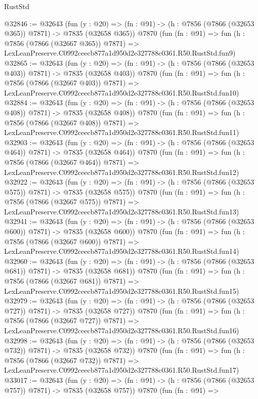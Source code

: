 \begin{lexlean}{RustStd}
\begin{coremodule}
@32846 := @32643
    (fun (y : @20) => (fn : @91) -> (h : @7856 (@7866 (@32653 @365)) @7871) -> @7835 (@32658 @365))
    @7870
    (fun (fn : @91) =>
    fun (h : @7856 (@7866 (@32667 @365)) @7871) =>
    LexLeanPreserve.C0992ceecb877a1d950d2e327788c0361.R50.RustStd.fun9)
@32865 := @32643
    (fun (y : @20) => (fn : @91) -> (h : @7856 (@7866 (@32653 @403)) @7871) -> @7835 (@32658 @403))
    @7870
    (fun (fn : @91) =>
    fun (h : @7856 (@7866 (@32667 @403)) @7871) =>
    LexLeanPreserve.C0992ceecb877a1d950d2e327788c0361.R50.RustStd.fun10)
@32884 := @32643
    (fun (y : @20) => (fn : @91) -> (h : @7856 (@7866 (@32653 @408)) @7871) -> @7835 (@32658 @408))
    @7870
    (fun (fn : @91) =>
    fun (h : @7856 (@7866 (@32667 @408)) @7871) =>
    LexLeanPreserve.C0992ceecb877a1d950d2e327788c0361.R50.RustStd.fun11)
@32903 := @32643
    (fun (y : @20) => (fn : @91) -> (h : @7856 (@7866 (@32653 @464)) @7871) -> @7835 (@32658 @464))
    @7870
    (fun (fn : @91) =>
    fun (h : @7856 (@7866 (@32667 @464)) @7871) =>
    LexLeanPreserve.C0992ceecb877a1d950d2e327788c0361.R50.RustStd.fun12)
@32922 := @32643
    (fun (y : @20) => (fn : @91) -> (h : @7856 (@7866 (@32653 @575)) @7871) -> @7835 (@32658 @575))
    @7870
    (fun (fn : @91) =>
    fun (h : @7856 (@7866 (@32667 @575)) @7871) =>
    LexLeanPreserve.C0992ceecb877a1d950d2e327788c0361.R50.RustStd.fun13)
@32941 := @32643
    (fun (y : @20) => (fn : @91) -> (h : @7856 (@7866 (@32653 @600)) @7871) -> @7835 (@32658 @600))
    @7870
    (fun (fn : @91) =>
    fun (h : @7856 (@7866 (@32667 @600)) @7871) =>
    LexLeanPreserve.C0992ceecb877a1d950d2e327788c0361.R50.RustStd.fun14)
@32960 := @32643
    (fun (y : @20) => (fn : @91) -> (h : @7856 (@7866 (@32653 @681)) @7871) -> @7835 (@32658 @681))
    @7870
    (fun (fn : @91) =>
    fun (h : @7856 (@7866 (@32667 @681)) @7871) =>
    LexLeanPreserve.C0992ceecb877a1d950d2e327788c0361.R50.RustStd.fun15)
@32979 := @32643
    (fun (y : @20) => (fn : @91) -> (h : @7856 (@7866 (@32653 @727)) @7871) -> @7835 (@32658 @727))
    @7870
    (fun (fn : @91) =>
    fun (h : @7856 (@7866 (@32667 @727)) @7871) =>
    LexLeanPreserve.C0992ceecb877a1d950d2e327788c0361.R50.RustStd.fun16)
@32998 := @32643
    (fun (y : @20) => (fn : @91) -> (h : @7856 (@7866 (@32653 @732)) @7871) -> @7835 (@32658 @732))
    @7870
    (fun (fn : @91) =>
    fun (h : @7856 (@7866 (@32667 @732)) @7871) =>
    LexLeanPreserve.C0992ceecb877a1d950d2e327788c0361.R50.RustStd.fun17)
@33017 := @32643
    (fun (y : @20) => (fn : @91) -> (h : @7856 (@7866 (@32653 @757)) @7871) -> @7835 (@32658 @757))
    @7870
    (fun (fn : @91) =>

\end{coremodule}
\end{lexlean}
